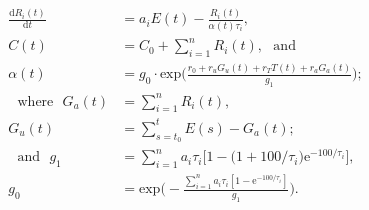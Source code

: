 \documentclass[gmd, manuscript]{copernicus}
\begin{document}
%
\begin{align}
    \frac{\text{d}R_{i}(t)}{\text{d}t} &= a_{i}E(t) - \frac{R_{i}(t)}{\alpha(t) \tau_{i}}, \label{eq:gaspool}\\
    C(t) &= C_0 + \sum_{i=1}^{n}{R_{i}(t)}, \text{~~and~~} \label{eq:conc}\\
    \alpha(t) &= g_0 \cdot \text{exp}\Big(\frac{r_0 + r_uG_{u}(t) + r_TT(t) + r_aG_a(t)}{g_1}\Big); \label{eq:alpha}\\
    \text{~~where~~} G_a(t) &= \sum_{i=1}^{n}{R_{i}(t)}, \nonumber\\
    G_u(t) &= \sum^t_{s=t_0}{E(s)}-G_a(t); \nonumber\\
    \text{~~and~~}g_1 &= \sum_{i=1}^{n}{a_i\tau_i\big[1 - \big(1 + 100/\tau_i\big)\text{e}^{-100/\tau_i}\big]}, \nonumber\\
    g_0 &= \text{exp} \Big( -\frac{ \sum_{i=1}^{n}{a_i \tau_i [1 - \text{e}^{-100/ \tau_i}]}}{g_1} \Big) . \nonumber
\end{align}\\
\end{document}

